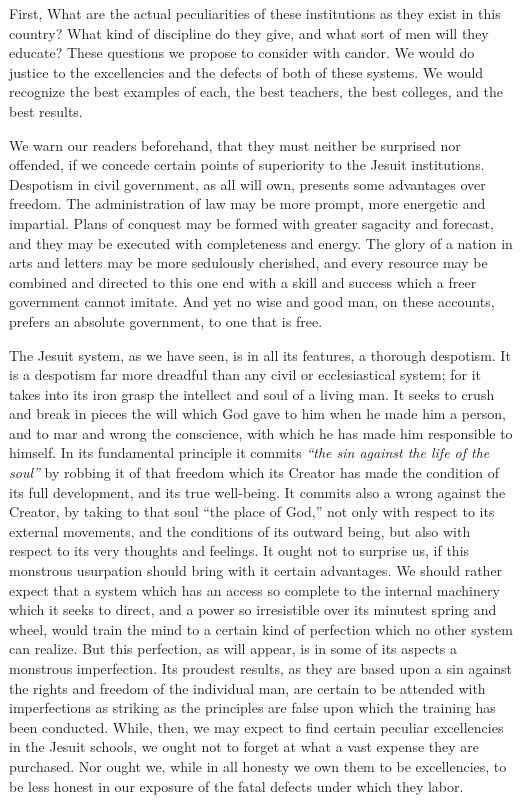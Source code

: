 \documentclass[]{book}
\begin{document}
First, What are the actual peculiarities of these institutions as they exist in this country? What kind of discipline do they give, and what sort of men will they educate? These questions we propose to consider with candor. We would do justice to the excellencies and the defects of both of these systems. We would recognize the best examples of each, the best teachers, the best colleges, and the best results.

We warn our readers beforehand, that they must neither be surprised nor offended, if we concede certain points of superiority to the Jesuit institutions. Despotism in civil government, as all will own, presents some advantages over freedom. The administration of law may be more prompt, more energetic and impartial. Plans of conquest may be formed with greater sagacity and forecast, and they may be executed with completeness and energy. The glory of a nation in arts and letters may be more sedulously cherished, and every resource may be combined and directed to this one end with a skill and success which a freer government cannot imitate. And yet no wise and good man, on these accounts, prefers an absolute government, to one that is free.

The Jesuit system, as we have seen, is in all its features, a thorough despotism. It is a despotism far more dreadful than any civil or ecclesiastical system; for it takes into its iron grasp the intellect and soul of a living man. It seeks to crush and break in pieces the will which God gave to him when he made him a person, and to mar and wrong the conscience, with which he has made him responsible to himself. In its fundamental principle it commits \emph{``the sin against the life of the soul''} by robbing it of that freedom which its Creator has made the condition of its full development, and its true well-being. It commits also a wrong against the Creator, by taking to that soul ``the place of God,'' not only with respect to its external movements, and the conditions of its outward being, but also with respect to its very thoughts and feelings. It ought not to surprise us, if this monstrous usurpation should bring with it certain advantages. We should rather expect that a system which has an access so complete to the internal machinery which it seeks to direct, and a power so irresistible over its minutest spring and wheel, would train the mind to a certain kind of perfection which no other system can realize. But this perfection, as will appear, is in some of its aspects a monstrous imperfection. Its proudest results, as they are based upon a sin against the rights and freedom of the individual man, are certain to be attended with imperfections as striking as the principles are false upon which the training has been conducted. While, then, we may expect to find certain peculiar excellencies in the Jesuit schools, we ought not to forget at what a vast expense they are purchased. Nor ought we, while in all honesty we own them to be excellencies, to be less honest in our exposure of the fatal defects under which they labor.
\end{document}
